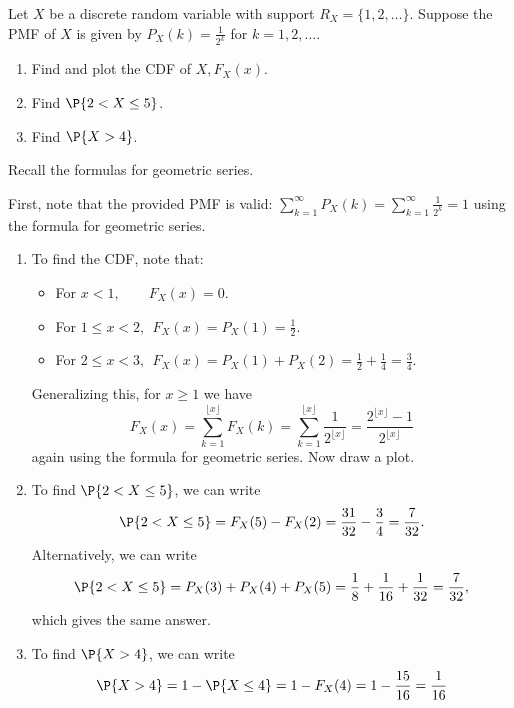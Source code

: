 \begin{exercise}\label{ex32111}
	Let $X$ be a discrete random variable with support $R_{X}=\{1, 2, \ldots\}$. Suppose the PMF of $X$ is given by $P_{X}(k) = \frac{1}{2^{k}}$ for $k = 1, 2 , \ldots$.
	\begin{enumerate}
		\item Find and plot the CDF of $X, F_{X}(x)$.
		\item Find $\P{2<X \leq 5}$.
		\item Find $\P{X>4}$.
	\end{enumerate}
	\begin{hint}
		Recall the formulas for geometric series.
	\end{hint}
	\begin{solution}
		First, note that the provided PMF is valid: $\sum_{k = 1}^{\infty} P_{X}(k)=\sum_{k=1}^{\infty} \frac{1}{2^{k}} = 1$ using the formula for geometric series.
		\begin{enumerate}
			\item  To find the CDF, note that:
			\begin{itemize}
				\item For $x<1, \quad \quad F_{X}(x)=0$.
				\item For $1 \leq x<2, \: \: F_{X}(x)=P_{X}(1)=\frac{1}{2}$.
				\item For $2 \leq x<3, \: \: F_{X}(x)=P_{X}(1)+P_{X}(2)=\frac{1}{2}+\frac{1}{4}=\frac{3}{4}$.
			\end{itemize}
			Generalizing this, for $x \geq 1$ we have
			\begin{equation*}
				F_{X}(x) = \sum_{k = 1}^{\lfloor x \rfloor} F_X(k) = \sum_{k = 1}^{\lfloor x \rfloor} \frac{1}{2^{\lfloor x \rfloor}} = \frac{2^{\lfloor x \rfloor}-1}{2^{\lfloor x \rfloor}}
			\end{equation*}
			again using the formula for geometric series. Now draw a plot.
			\item To find $\P{2<X \leq 5}$, we can write
			\begin{equation*}
				\P{2<X \leq 5} = F_{X}(5) - F_{X}(2) = \frac{31}{32}-\frac{3}{4}=\frac{7}{32}.
			\end{equation*}
			Alternatively, we can write
			\begin{equation*}
				\P{2<X \leq 5} = P_{X}(3)+P_{X}(4)+P_{X}(5)=\frac{1}{8}+\frac{1}{16}+\frac{1}{32}=\frac{7}{32},
			\end{equation*}
			which gives the same answer.
			\item To find $\P{X>4}$, we can write
			\begin{equation*}
				\P{X>4} = 1 - \P{X \leq 4} = 1-F_{X}(4)=1-\frac{15}{16}=\frac{1}{16}
			\end{equation*}
		\end{enumerate}
	\end{solution}
\end{exercise}

